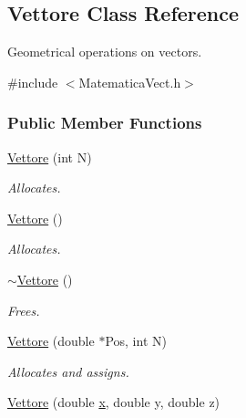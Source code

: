 \hypertarget{classVettore}{}\subsection{Vettore Class Reference}
\label{classVettore}


Geometrical operations on vectors.  




{\ttfamily \#include $<$Matematica\+Vect.\+h$>$}

\subsubsection*{Public Member Functions}
\begin{DoxyCompactItemize}
\item 
\hyperlink{classVettore_a8be37a18dd9819f267ef0fca4770d6bf}{Vettore} (int N)\hypertarget{classVettore_a8be37a18dd9819f267ef0fca4770d6bf}{}\label{classVettore_a8be37a18dd9819f267ef0fca4770d6bf}

\begin{DoxyCompactList}\small\item\em Allocates. \end{DoxyCompactList}\item 
\hyperlink{classVettore_a8f9b4eac311cb366dd049eefa8d45d41}{Vettore} ()\hypertarget{classVettore_a8f9b4eac311cb366dd049eefa8d45d41}{}\label{classVettore_a8f9b4eac311cb366dd049eefa8d45d41}

\begin{DoxyCompactList}\small\item\em Allocates. \end{DoxyCompactList}\item 
\hyperlink{classVettore_a5864229515ff327ae85057b51a8035a6}{$\sim$\+Vettore} ()\hypertarget{classVettore_a5864229515ff327ae85057b51a8035a6}{}\label{classVettore_a5864229515ff327ae85057b51a8035a6}

\begin{DoxyCompactList}\small\item\em Frees. \end{DoxyCompactList}\item 
\hyperlink{classVettore_ab5b3efc833cf7efa62feeede44c377a5}{Vettore} (double $\ast$Pos, int N)\hypertarget{classVettore_ab5b3efc833cf7efa62feeede44c377a5}{}\label{classVettore_ab5b3efc833cf7efa62feeede44c377a5}

\begin{DoxyCompactList}\small\item\em Allocates and assigns. \end{DoxyCompactList}\item 
\hyperlink{classVettore_a4da1d1de9404fa6f377a45b6ddd36df8}{Vettore} (double \hyperlink{classVettore_a711aad4cbe735871dd9e91ab575c878b}{x}, double y, double z)\hypertarget{classVettore_a4da1d1de9404fa6f377a45b6ddd36df8}{}\label{classVettore_a4da1d1de9404fa6f377a45b6ddd36df8}


\end{DoxyCompactItemize}
